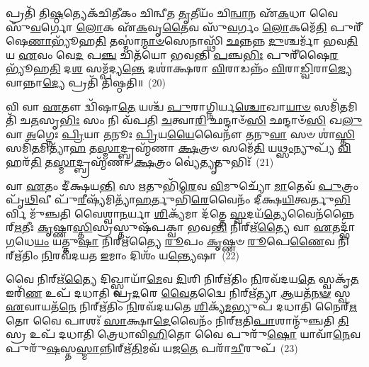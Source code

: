 𑌪𑍍𑌰𑌤𑌿᳴ 𑌤𑌿\-\ul{𑌷𑍍𑌠}\-𑌤𑍍𑌯𑍇𑌕᳴𑌚𑌿𑌤𑍀𑌕𑌂 𑌚𑌿𑌨𑍍𑌵𑍀𑌤 \ul{𑌤𑍃}\-𑌤𑍀𑌯𑌂᳴ 𑌚𑌿\-\ul{𑌨𑍍𑌵𑌾}\-𑌨 𑌏᳴\-\ul{𑌕}\-𑌧𑌾 𑌵𑍈 𑌸𑍁᳴\-\ul{𑌵}\-𑌰𑍍𑌗𑍋 \ul{𑌲𑍋}\-𑌕 𑌏᳴\-\ul{𑌕}\-𑌵𑍃\-\ul{𑌤𑍈}\-𑌵 𑌸𑍁᳴\-\ul{𑌵}\-𑌰𑍍𑌗𑌂 \ul{𑌲𑍋}\-𑌕𑌮𑍇᳴\-\ul{𑌤𑌿} 𑌪𑍁𑌰𑍀᳴𑌷𑍇\-\ul{𑌣𑌾}\-𑌭𑍍𑌯𑍂᳴𑌹\-\ul{𑌤𑌿} 𑌤𑌸𑍍𑌮𑌾॑\-\ul{𑌨𑍍𑌮𑌾}\-\-\ul{𑍞}\-𑌸𑍇𑌨𑌾𑌸𑍍𑌥𑌿᳴ \ul{𑌛}\-𑌨𑍍𑌨𑌨𑍍𑌨 \ul{𑌦𑍁}\-𑌶𑍍𑌚𑌰𑍍𑌮𑌾᳴ 𑌭𑌵\-\ul{𑌤𑌿} 𑌯 \ul{𑌏}\-𑌵𑌂 𑌵𑍇\-\ul{𑌦} 𑌪\-\ul{𑌞𑍍𑌚} 𑌚𑌿𑌤᳴𑌯𑍋 𑌭𑌵𑌨𑍍𑌤𑌿 \ul{𑌪}\-𑌞𑍍𑌚\-\ul{𑌭𑌿𑌃} 𑌪𑍁𑌰𑍀᳴𑌷𑍈\-\ul{𑌰}\-𑌭𑍍𑌯𑍂᳴𑌹\-\ul{𑌤𑌿} 𑌦\-\ul{𑌶} 𑌸𑌮𑍍𑌪᳴𑌦𑍍𑌯\-\ul{𑌨𑍍𑌤𑍇} 𑌦𑌶𑌾॑𑌕𑍍𑌷𑌰𑌾 \ul{𑌵𑌿}\-𑌰𑌾𑌡𑌨𑍍𑌨𑌂᳴ \ul{𑌵𑌿}\-𑌰𑌾\-\ul{𑌡𑍍𑌵𑌿}\-𑌰𑌾\-\ul{𑌜𑍍𑌯𑍇}\-𑌵𑌾𑌨𑍍𑌨𑌾\-\ul{𑌦𑍍𑌯𑍇} 𑌪𑍍𑌰𑌤𑌿᳴ 𑌤𑌿𑌷𑍍𑌠𑌤𑌿॥~(20)

{\anuvakamend[{\-\ul{𑌅}\-\-\ul{𑌦𑍍𑌧𑍍𑌯}\-\-\ul{𑌵}\-\-\ul{𑌸𑌾}\-𑌯𑌯᳴\-\ul{𑌤𑌿} 𑌹𑍍𑌯𑍇᳴𑌤\-\ul{𑌦𑍍𑌵𑌿}\-𑌶𑍍𑌵𑌾𑌮𑌿᳴𑌤𑍍𑌰𑌸𑍍𑌯𑌾𑌦𑌧\-\ul{𑌤} 𑌦𑍍𑌵𑍇 \ul{𑌲𑍋}\-𑌕𑌸𑍍𑌯᳴ \ul{𑌲𑍋}\-𑌕𑍇𑌷𑍁᳴ \ul{𑌸}\-𑌪𑍍𑌤𑌚᳴𑌤𑍍𑌵𑌾𑌰𑌿𑍞𑌶𑌚𑍍𑌚}]}%

𑌵𑌿 𑌵𑌾 \ul{𑌏}\-𑌤𑍗 𑌦𑍍𑌵𑌿᳴𑌷𑌾\-\ul{𑌤𑍇} 𑌯𑌶𑍍𑌚᳴ \ul{𑌪𑍁}\-𑌰𑌾𑌗𑍍𑌨𑌿𑌰𑍍𑌯\-\ul{𑌶𑍍𑌚𑍋}\-𑌖𑌾\-\ul{𑌯𑌾}\-\-\ul{𑍞} 𑌸𑌮𑌿᳴\-\ul{𑌤}\-𑌮𑌿𑌤𑌿᳴ 𑌚\-\ul{𑌤}\-𑌸𑍃\-\ul{𑌭𑌿𑌃} 𑌸𑌂 𑌨𑌿 𑌵᳴𑌪𑌤𑌿 \ul{𑌚}\-𑌤𑍍𑌵𑌾\-\ul{𑌰𑌿} 𑌛𑌨𑍍𑌦𑌾𑍞᳴\-\ul{𑌸𑌿} 𑌛𑌨𑍍𑌦𑌾𑍞᳴\-\ul{𑌸𑌿} 𑌖\-\ul{𑌲𑍁} 𑌵𑌾 \ul{𑌅}\-𑌗𑍍𑌨𑍇𑌃 \ul{𑌪𑍍𑌰𑌿}\-𑌯𑌾 \ul{𑌤}\-𑌨𑍂𑌃 \ul{𑌪𑍍𑌰𑌿}\-𑌯\-\ul{𑌯𑍈}\-𑌵𑍈𑌨𑍗᳴ \ul{𑌤}\-𑌨𑍁\-\ul{𑌵𑌾} 𑌸𑍞 𑌶𑌾॑\-\ul{𑌸𑍍𑌤𑌿} 𑌸𑌮𑌿᳴\-\ul{𑌤}\-𑌮𑌿𑌤𑍍𑌯𑌾᳴\-\ul{𑌹} 𑌤\-\ul{𑌸𑍍𑌮𑌾}\-𑌦𑍍𑌬𑍍𑌰𑌹𑍍𑌮᳴𑌣𑌾 \ul{𑌕𑍍𑌷}\-𑌤𑍍𑌰𑍞 𑌸𑌮𑍇᳴\-\ul{𑌤𑌿} 𑌯\-\ul{𑌥𑍍𑌸𑌂}\-𑌨𑍍𑌯𑍁𑌪𑍍𑌯᳴ \ul{𑌵𑌿}\-𑌹𑌰᳴\-\ul{𑌤𑌿} 𑌤\-\ul{𑌸𑍍𑌮𑌾}\-𑌦𑍍𑌬𑍍𑌰𑌹𑍍𑌮᳴𑌣𑌾 \ul{𑌕𑍍𑌷}\-𑌤𑍍𑌰𑌂 𑌵𑍍𑌯𑍇॑\-\ul{𑌤𑍍𑌯𑍃}\-𑌤𑍁𑌭𑌿𑌃᳴~(21)

𑌵𑌾 \ul{𑌏}\-𑌤𑌂 𑌦𑍀॑𑌕𑍍𑌷𑌯\-\ul{𑌨𑍍𑌤𑌿} 𑌸 \ul{𑌋}\-𑌤𑍁𑌭𑌿᳴\-\ul{𑌰𑍇}\-𑌵 \ul{𑌵𑌿}\-𑌮𑍁𑌚𑍍𑌯𑍋᳴ \ul{𑌮𑌾}\-𑌤𑍇𑌵᳴ \ul{𑌪𑍁}\-𑌤𑍍𑌰𑌂 𑌪𑍃᳴\-\ul{𑌥𑌿}\-𑌵𑍀 𑌪𑍁᳴\-\ul{𑌰𑍀}\-𑌷𑍍𑌯᳴𑌮𑌿𑌤𑍍𑌯𑌾᳴\-\ul{𑌹}\-𑌰𑍍𑌤𑍁𑌭𑌿᳴\-\ul{𑌰𑍇}\-𑌵𑍈𑌨𑌂᳴ 𑌦𑍀𑌕𑍍𑌷\-\ul{𑌯𑌿}\-𑌤𑍍𑌵𑌰𑍍𑌤𑍁\-\ul{𑌭𑌿}\-𑌰𑍍𑌵𑌿 𑌮𑍁᳴𑌞𑍍𑌚𑌤𑌿 𑌵𑍈𑌶𑍍𑌵𑌾\-\ul{𑌨}\-𑌰𑍍𑌯𑌾 \ul{𑌶𑌿}\-𑌕𑍍𑌯᳴𑌮𑌾 𑌦᳴𑌤𑍍𑌤𑍇 \ul{𑌸𑍍𑌵}\-𑌦𑌯᳴\-\ul{𑌤𑍍𑌯𑍇}\-𑌵𑍈𑌨᳴𑌨𑍍𑌨𑍈𑌰𑍍\mbox{}\-\ul{𑌋}\-𑌤𑍀𑌃 \ul{𑌕𑍃}\-𑌷𑍍𑌣𑌾\-\ul{𑌸𑍍𑌤𑌿}\-𑌸𑍍𑌰𑌸𑍍𑌤𑍁𑌷᳴𑌪𑌕𑍍𑌵𑌾 𑌭𑌵\-\ul{𑌨𑍍𑌤𑌿} 𑌨𑌿𑌰𑍍\mbox{}𑌋᳴\-\ul{𑌤𑍍𑌯𑍈} 𑌵𑌾 \ul{𑌏}\-𑌤𑌦𑍍𑌭𑌾᳴\-\ul{𑌗}\-𑌧𑍇\-\ul{𑌯𑌂} 𑌯𑌤𑍍𑌤𑍁\-\ul{𑌷𑌾} 𑌨𑌿𑌰𑍍\mbox{}𑌋᳴𑌤𑍍𑌯𑍈 \ul{𑌰𑍂}\-𑌪𑌂 \ul{𑌕𑍃}\-𑌷𑍍𑌣𑍞 \ul{𑌰𑍂}\-𑌪𑍇\-\ul{𑌣𑍈}\-𑌵 𑌨𑌿𑌰𑍍\mbox{}𑌋᳴𑌤𑌿𑌂 \ul{𑌨𑌿}\-𑌰𑌵᳴𑌦𑌯𑌤 \ul{𑌇}\-𑌮𑌾𑌂 𑌦𑌿𑌶𑌂᳴ 𑌯\-\ul{𑌨𑍍𑌤𑍍𑌯𑍇}\-𑌷𑌾~(22)

𑌵𑍈 𑌨𑌿𑌰𑍍\mbox{}𑌋᳴\-\ul{𑌤𑍍𑌯𑍈} 𑌦𑌿𑌖𑍍𑌸𑍍𑌵𑌾𑌯𑌾᳴\-\ul{𑌮𑍇}\-𑌵 \ul{𑌦𑌿}\-𑌶𑌿 𑌨𑌿𑌰𑍍\mbox{}𑌋᳴𑌤𑌿𑌂 \ul{𑌨𑌿}\-𑌰𑌵᳴𑌦𑌯\-\ul{𑌤𑍇} 𑌸𑍍𑌵𑌕𑍃᳴\-\ul{𑌤} 𑌇𑌰𑌿᳴\-\ul{𑌣} 𑌉𑌪᳴ 𑌦𑌧𑌾𑌤𑌿 𑌪𑍍𑌰\-\ul{𑌦}\-𑌰𑍇 \ul{𑌵𑍈}\-𑌤𑌦𑍍𑌵𑍈 𑌨𑌿𑌰𑍍\mbox{}𑌋᳴𑌤𑍍𑌯𑌾 \ul{𑌆}\-𑌯𑌤᳴\-\ul{𑌨}\-\-\ul{𑍟} 𑌸𑍍𑌵 \ul{𑌏}\-𑌵𑌾𑌯𑌤᳴\-\ul{𑌨𑍇} 𑌨𑌿𑌰𑍍\mbox{}𑌋᳴𑌤𑌿𑌂 \ul{𑌨𑌿}\-𑌰𑌵᳴𑌦𑌯𑌤𑍇 \ul{𑌶𑌿}\-𑌕𑍍𑌯᳴\-\ul{𑌮}\-𑌭𑍍𑌯𑍁𑌪᳴ 𑌦𑌧𑌾𑌤𑌿 𑌨𑍈𑌰𑍍\mbox{}\-\ul{𑌋}\-𑌤𑍋 𑌵𑍈 𑌪𑌾𑌶𑌃᳴ \ul{𑌸𑌾}\-𑌕𑍍𑌷𑌾\-\ul{𑌦𑍇}\-𑌵𑍈𑌨𑌂᳴ 𑌨𑌿𑌰𑍍\mbox{}𑌋𑌤𑌿\-\ul{𑌪𑌾}\-𑌶𑌾𑌨𑍍𑌮𑍁᳴𑌞𑍍𑌚𑌤𑌿 \ul{𑌤𑌿}\-𑌸𑍍𑌰 𑌉𑌪᳴ 𑌦𑌧𑌾𑌤𑌿 𑌤𑍍𑌰𑍇𑌧𑌾𑌵𑌿\-\ul{𑌹𑌿}\-𑌤𑍋 𑌵𑍈 𑌪𑍁𑌰𑍁᳴\-\ul{𑌷𑍋} 𑌯𑌾𑌵𑌾᳴\-\ul{𑌨𑍇}\-𑌵 𑌪𑍁𑌰𑍁᳴\-\ul{𑌷}\-𑌸𑍍𑌤\-\ul{𑌸𑍍𑌮𑌾}\-𑌨𑍍𑌨𑌿𑌰𑍍\mbox{}𑌋᳴\-\ul{𑌤𑌿}\-𑌮𑌵᳴ 𑌯𑌜\-\ul{𑌤𑍇} 𑌪𑌰𑌾᳴\-\ul{𑌚𑍀}\-𑌰𑍁𑌪᳴~(23)


